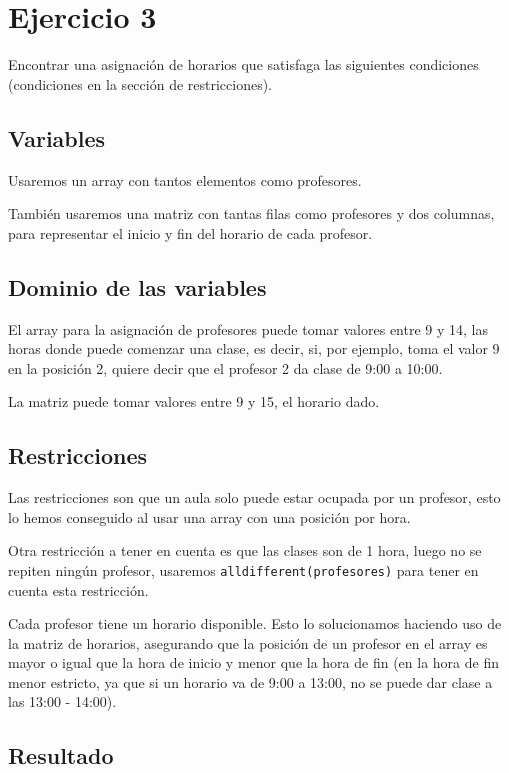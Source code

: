 \documentclass[11pt, spanish]{article}
\begin{document}
\section{Ejercicio 3}

Encontrar una asignación de horarios que satisfaga las siguientes condiciones (condiciones en la sección de restricciones).

\subsection{Variables}

Usaremos un array con tantos elementos como profesores.

También usaremos una matriz con tantas filas como profesores y dos columnas, para representar el inicio y fin del horario de cada profesor.

\subsection{Dominio de las variables}

El array para la asignación de profesores puede tomar valores entre 9 y 14, las horas donde puede comenzar una clase, es decir, si, por ejemplo, toma el valor 9 en la posición 2, quiere decir que el profesor 2 da clase de 9:00 a 10:00.

La matriz puede tomar valores entre 9 y 15, el horario dado.

\subsection{Restricciones}

Las restricciones son que un aula solo puede estar ocupada por un profesor, esto lo hemos conseguido al usar una array con una posición por hora.

Otra restricción a tener en cuenta es que las clases son de 1 hora, luego no se repiten ningún profesor, usaremos \texttt{alldifferent(profesores)} para tener en cuenta esta restricción.

Cada profesor tiene un horario disponible. Esto lo solucionamos haciendo uso de la matriz de horarios, asegurando que la posición de un profesor en el array es mayor o igual que la hora de inicio y menor que la hora de fin (en la hora de fin menor estricto, ya que si un horario va de 9:00 a 13:00, no se puede dar clase a las 13:00 - 14:00).

\subsection{Resultado}
\end{document}
